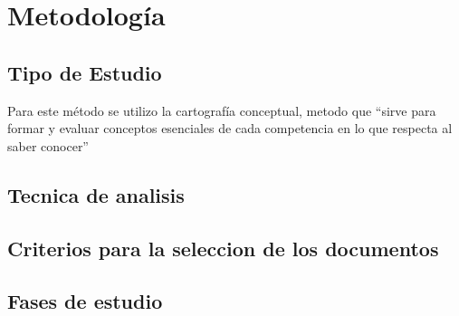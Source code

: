 \section{Metodología}
\subsection{Tipo de Estudio}
Para este método se utilizo la cartografía conceptual, metodo que “sirve para formar y evaluar conceptos esenciales de cada competencia en lo que respecta al saber conocer” \parencite[][p. 16]{tobon2012} 
\subsection{Tecnica de analisis}
\subsection{Criterios para la seleccion de los documentos}
\subsection{Fases de estudio}

%
%

